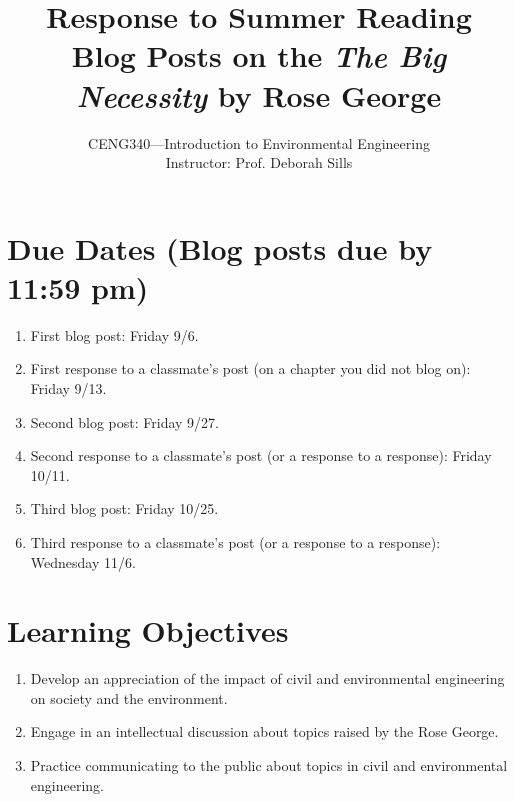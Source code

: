 \documentclass[12pt,letterpaper]{article}
\begin{document}
\setlength{\parindent}{0cm} 


\frenchspacing

\title{Response to Summer Reading \\ \vspace{2 mm} {\Large Blog Posts on the \emph{The Big Necessity} by Rose George}}

\author {CENG340---Introduction to Environmental Engineering\\ \vspace{2 mm} {Instructor: Prof. Deborah Sills}}
\date {}
\maketitle

\section *{Due Dates (Blog posts due by 11:59 pm)}
\begin{enumerate}
\item First blog post: Friday 9/6.
\item First response to a classmate's post (on a chapter you did not blog on): Friday 9/13.
\item Second blog post: Friday 9/27.
\item Second response to a classmate's post (or a response to a response): Friday 10/11.
\item Third blog post: Friday 10/25.
\item Third response to  a classmate's post (or a response to a response): Wednesday 11/6.
\end{enumerate}

\section *{Learning Objectives}
\begin{enumerate}
\item Develop an appreciation of the impact of civil and environmental engineering on society and the environment.
\item Engage in an intellectual discussion about topics raised by the Rose George.
\item Practice communicating to the public about topics in civil and environmental engineering.
\end{enumerate}
\end{document}
